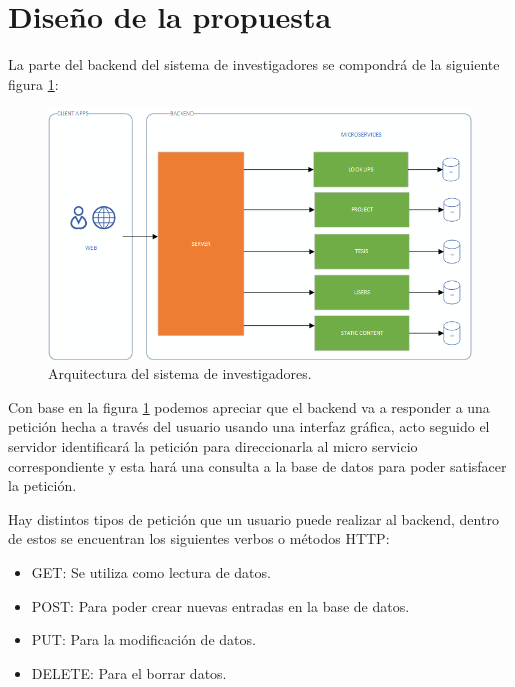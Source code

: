 
\section{Diseño de la propuesta}

    La parte del backend del sistema de investigadores se compondrá de la siguiente figura \ref{fig:architecture}:
    
    \begin{figure}[H]
        \centering
        \includegraphics[width=\textwidth]{Propuesta_Plantilla_Tesis_LaTeX_UAG/imagenes/ARCHITECTURE.png}
        \caption{Arquitectura del sistema de investigadores.}
        \label{fig:architecture}
    \end{figure}
    
    Con base en la figura \ref{fig:architecture} podemos apreciar que el backend va a responder a una petición hecha a través del usuario usando una interfaz gráfica, acto seguido el servidor identificará la petición para direccionarla al micro servicio correspondiente y esta hará una consulta a la base de datos para poder satisfacer la petición.
    
    Hay distintos tipos de petición que un usuario puede realizar al backend, dentro de estos se encuentran los siguientes verbos o métodos HTTP:
    \raggedbottom
    \begin{itemize}
        \item GET: Se utiliza como lectura de datos.
        \item POST: Para poder crear nuevas entradas en la base de datos.
        \item PUT: Para la modificación de datos.
        \item DELETE: Para el borrar datos.
    \end{itemize}
    
